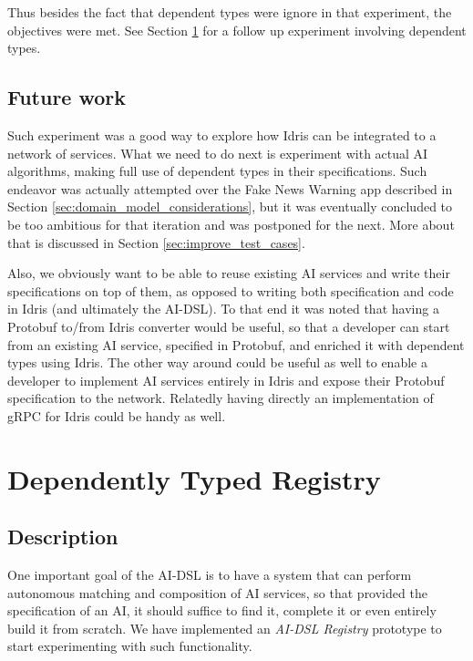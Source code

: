 \documentclass[]{report}
\begin{document}
Thus besides the fact that dependent types were ignore in that
experiment, the objectives were met.  See Section \ref{sec:dependently_typed_registry}
for a follow up experiment involving dependent types.

\subsection{Future work}
\label{sec:net_ai_future_work}
Such experiment was a good way to explore how Idris can be integrated
to a network of services.  What we need to do next is experiment with
actual AI algorithms, making full use of dependent types in their
specifications.  Such endeavor was actually attempted over the Fake
News Warning app described in Section
\ref{sec:domain_model_considerations}, but it was eventually concluded
to be too ambitious for that iteration and was postponed for the next.
More about that is discussed in Section \ref{sec:improve_test_cases}.

Also, we obviously want to be able to reuse existing AI services and
write their specifications on top of them, as opposed to writing both
specification and code in Idris (and ultimately the AI-DSL).  To that
end it was noted that having a Protobuf to/from Idris converter would
be useful, so that a developer can start from an existing AI service,
specified in Protobuf, and enriched it with dependent types using
Idris.  The other way around could be useful as well to enable a
developer to implement AI services entirely in Idris and expose their
Protobuf specification to the network.  Relatedly having directly an
implementation of gRPC for Idris could be handy as well.

\section{Dependently Typed Registry}
\label{sec:dependently_typed_registry}

\subsection{Description}

One important goal of the AI-DSL is to have a system that can perform
autonomous matching and composition of AI services, so that provided
the specification of an AI, it should suffice to find it, complete it
or even entirely build it from scratch.  We have implemented an
\emph{AI-DSL Registry} prototype to start experimenting with such
functionality.
\end{document}
